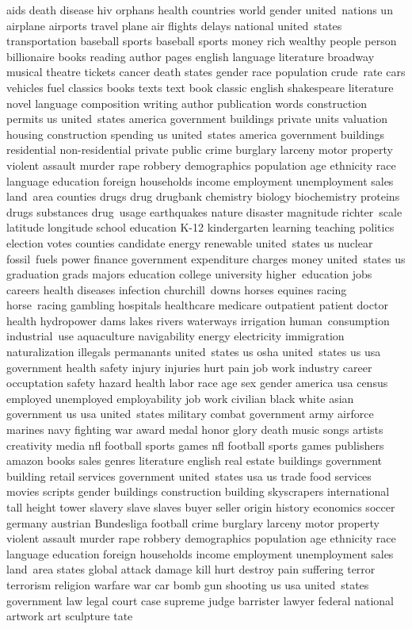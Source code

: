 aids
death
disease
hiv
orphans
health
countries
world
gender
united~nations
un
airplane
airports
travel
plane
air
flights
delays
national
united~states
transportation
baseball
sports
baseball
sports
money
rich
wealthy
people
person
billionaire
books
reading
author
pages
english
language
literature
broadway
musical
theatre
tickets
cancer
death
states
gender
race
population
crude~rate
cars
vehicles
fuel
classics
books
texts
text
book
classic
english
shakespeare
literature
novel
language
composition
writing
author
publication
words
construction
permits
us
united~states
america
government
buildings
private
units
valuation
housing
construction
spending
us
united~states
america
government
buildings
residential
non-residential
private
public
crime
burglary
larceny
motor
property
violent
assault
murder
rape
robbery
demographics
population
age
ethnicity
race
language
education
foreign
households
income
employment
unemployment
sales
land~area
counties
drugs
drug
drugbank
chemistry
biology
biochemistry
proteins
drugs
substances
drug~usage
earthquakes
nature
disaster
magnitude
richter~scale
latitude
longitude
school
education
K-12
kindergarten
learning
teaching
politics
election
votes
counties
candidate
energy
renewable
united~states
us
nuclear
fossil~fuels
power
finance
government
expenditure
charges
money
united~states
us
graduation
grads
majors
education
college
university
higher~education
jobs
careers
health
diseases
infection
churchill~downs
horses
equines
racing
horse~racing
gambling
hospitals
healthcare
medicare
outpatient
patient
doctor
health
hydropower
dams
lakes
rivers
waterways
irrigation
human~consumption
industrial~use
aquaculture
navigability
energy
electricity
immigration
naturalization
illegals
permanants
united~states
us
osha
united~states
us
usa
government
health
safety
injury
injuries
hurt
pain
job
work
industry
career
occuptation
safety
hazard
health
labor
race
age
sex
gender
america
usa
census
employed
unemployed
employability
job
work
civilian
black
white
asian
government
us
usa
united~states
military
combat
government
army
airforce
marines
navy
fighting
war
award
medal
honor
glory
death
music
songs
artists
creativity
media
nfl
football
sports
games
nfl
football
sports
games
publishers
amazon
books
sales
genres
literature
english
real
estate
buildings
government
building
retail
services
government
united~states
usa
us
trade
food
services
movies
scripts
gender
buildings
construction
building
skyscrapers
international
tall
height
tower
slavery
slave
slaves
buyer
seller
origin
history
economics
soccer
germany
austrian
Bundesliga
football
crime
burglary
larceny
motor
property
violent
assault
murder
rape
robbery
demographics
population
age
ethnicity
race
language
education
foreign
households
income
employment
unemployment
sales
land~area
states
global
attack
damage
kill
hurt
destroy
pain
suffering
terror
terrorism
religion
warfare
war
car
bomb
gun
shooting
us
usa
united~states
government
law
legal
court
case
supreme
judge
barrister
lawyer
federal
national
artwork
art
sculpture
tate
